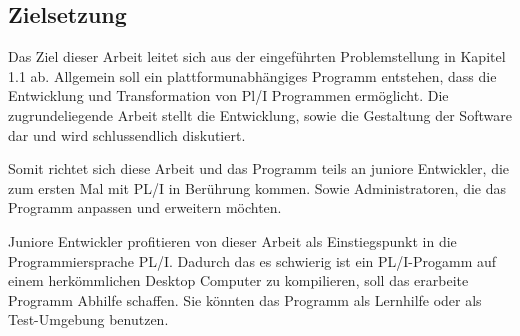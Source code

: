      
     



% 	 
%	 
%
    
	\subsection{Zielsetzung}
Das Ziel dieser Arbeit leitet sich aus der eingeführten Problemstellung in Kapitel 1.1 ab. Allgemein soll ein plattformunabhängiges Programm entstehen, dass die  Entwicklung und Transformation von Pl/I Programmen ermöglicht. Die zugrundeliegende Arbeit stellt die Entwicklung, sowie die Gestaltung der Software dar und wird schlussendlich diskutiert. 
	
Somit richtet sich diese Arbeit und das Programm teils an juniore Entwickler, die zum ersten Mal mit PL/I in Berührung kommen. Sowie Administratoren, die das Programm anpassen und erweitern möchten. 
	
Juniore Entwickler profitieren von dieser Arbeit als Einstiegspunkt in die Programmiersprache PL/I. Dadurch das es schwierig ist ein PL/I-Progamm auf einem herkömmlichen Desktop Computer zu kompilieren, soll das erarbeite Programm Abhilfe schaffen. Sie könnten das Programm als Lernhilfe oder als Test-Umgebung benutzen.

